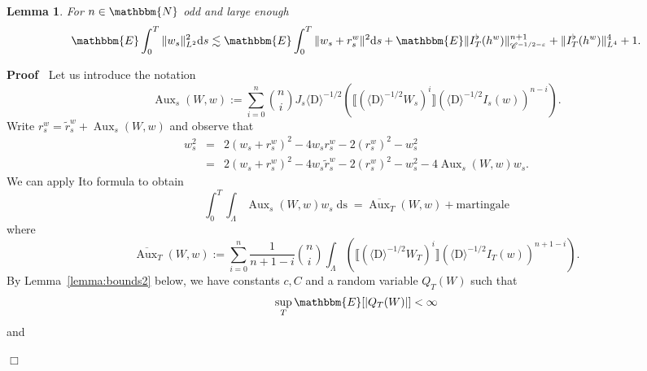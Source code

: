 \documentclass[11pt]{article}
\newcommand{\assign}{:=}
\newcommand{\mathD}{\mathrm{D}}
\newcommand{\mathd}{\mathrm{d}}
\newcommand{\tmop}[1]{\ensuremath{\operatorname{#1}}}
\newenvironment{proof}{\noindent\textbf{Proof\ }}{\hspace*{\fill}$\Box$\medskip}
\newtheorem{lemma}{Lemma}
\newcommand{\VV}{\mathscr{C}}
\begin{document}
\begin{lemma}
  \label{lemma:driftgronwallestimate}For $n \in \mathbbm{N}$ odd and large
  enough
  \[ \mathbbm{E} \int^T_0 \| w_s \|_{L^2}^2 \mathd s \lesssim \mathbbm{E}
     \int^T_0 \| w_s + r_s^w \|^2 \mathd s +\mathbbm{E} \| I_T^{\flat} (h^w)
     \|^{n + 1}_{\VV^{- 1 / 2 - \varepsilon}} + \| I^{\flat}_T (h^w)
     \|^4_{L^4} + 1. \]
\end{lemma}

\begin{proof}
  Let us introduce the notation
  \[ \tmop{Aux}_s (W, w) \assign \sum_{i = 0}^n \binom{n}{i} J_s \langle
     \mathD \rangle^{- 1 / 2} (\llbracket (\langle \mathD \rangle^{- 1 / 2}
     W_s)^i \rrbracket (\langle \mathD \rangle^{- 1 / 2} I_s (w))^{n - i}_{})
     . \]
  Write $r_s^w = \tilde{r}_s^w + \tmop{Aux}_s (W, w)$ and observe that
  \begin{eqnarray*}
    w^2_s & = & 2 (w_s + r_s^w)^2 - 4 w_s r_s^w - 2 (r_s^w)^2 - w^2_s\\
    & = & 2 (w_s + r_s^w)^2 - 4 w_s \tilde{r}_s^w - 2 (r_s^w)^2 - w^2_s - 4
    \tmop{Aux}_s (W, w) w_s .
  \end{eqnarray*}
  We can apply Ito formula to obtain
  \[ \int^T_0 \int_{\Lambda} \tmop{Aux}_s (W, w) w_s \tmop{ds} =
     \overline{\tmop{Aux}}_T (W, w) + \text{martingale} \]
  where
  \[ \overline{\tmop{Aux}}_T (W, w) \assign \sum_{i = 0}^n \frac{1}{n + 1 - i}
     \binom{n}{i} \int_{\Lambda} (\llbracket (\langle \mathD \rangle^{- 1 / 2}
     W_T)^i \rrbracket (\langle \mathD \rangle^{- 1 / 2} I_T (w))^{n + 1 -
     i}_{}) . \]
  By Lemma~\ref{lemma:bounds2} below, we have constants $c, C$ and a random
  variable $Q_T (W)$ such that
  \[ \sup_T \mathbbm{E} [| Q_T (W) |] < \infty \]
  and
  

\end{proof}
\end{document}
